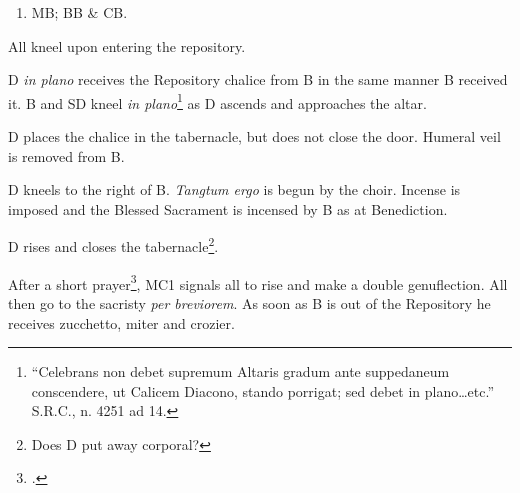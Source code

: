 {\begin{enumerate}
    \item MB; BB \& CB.

\end{enumerate}

\rubric All kneel upon entering the repository.

\rubric D \textit{in plano} receives the Repository chalice from B in the same
manner B received it. B and SD kneel \textit{in plano}\footnote{``Celebrans non
debet supremum Altaris gradum ante suppedaneum conscendere, ut Calicem Diacono,
stando porrigat; sed debet in plano\dots etc.'' S.R.C., n. 4251 ad 14.} as D
ascends and approaches the altar.

\rubric D places the chalice in the tabernacle, but does not close the door.
Humeral veil is removed from B.

\rubric D kneels to the right of B. \textit{Tangtum ergo} is begun by the
choir. Incense is imposed and the Blessed Sacrament is incensed by B as at
Benediction.

\rubric D rises and closes the tabernacle\footnote{Does D put away corporal?}.

\rubric After a short prayer\footcite[B is instructed to give a blessing at
this point with miter and crozier. Is this reserved to the Ordinary?][p.
192]{stehle}, MC1 signals all to rise and make a double genuflection. All then
go to the sacristy \textit{per breviorem}. As soon as B is out of the
Repository he receives zucchetto, miter and crozier.

}


